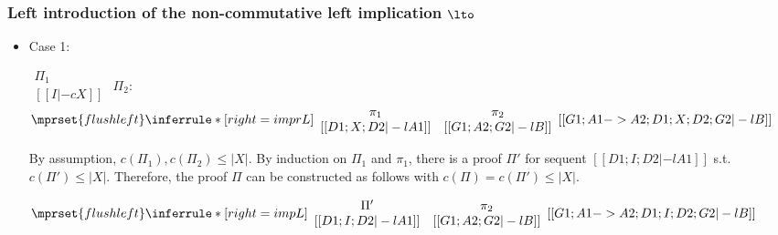 \subsubsection{Left introduction of the non-commutative left implication $\lto$}
\begin{itemize}
\item Case 1:
      \begin{center}
        \scriptsize
        \begin{math}
          \begin{array}{c}
            \Pi_1 \\
            {[[I |-c X]]}
          \end{array}
        \end{math}
        \qquad\qquad
        $\Pi_2$:
        \begin{math}
          $$\mprset{flushleft}
          \inferrule* [right={\tiny imprL}] {
            {
              \begin{array}{cc}
                \pi_1 & \pi_2 \\
                {[[D1; X; D2 |-l A1]]} & {[[G1; A2; G2 |-l B]]}
              \end{array}
            }
          }{[[G1; A1 -> A2; D1; X; D2; G2 |-l B]]}
        \end{math}
      \end{center}
      By assumption, $c(\Pi_1),c(\Pi_2)\leq |X|$. By induction on $\Pi_1$
      and $\pi_1$, there is a proof $\Pi'$ for sequent
      $[[D1; I; D2 |-l A1]]$ s.t. $c(\Pi') \leq |X|$. Therefore, the proof
      $\Pi$ can be constructed as follows with $c(\Pi) = c(\Pi') \leq |X|$.
      \begin{center}
        \scriptsize
        \begin{math}
          $$\mprset{flushleft}
          \inferrule* [right={\tiny impL}] {
            {
              \begin{array}{cc}
                \Pi' & \pi_2 \\
                {[[D1; I; D2 |-l A1]]} & {[[G1; A2; G2 |-l B]]}
              \end{array}
            }
          }{[[G1; A1 -> A2; D1; I; D2; G2 |-l B]]}
        \end{math}
      \end{center}


\end{itemize}
